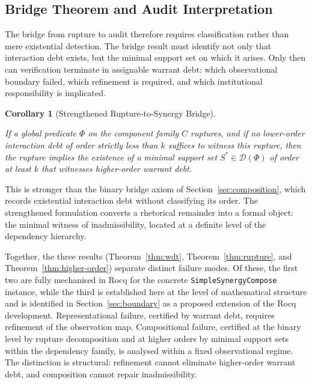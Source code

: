 \documentclass[12pt]{article}
\theoremstyle{plain}
\newtheorem{corollary}[theorem]{Corollary}
\theoremstyle{definition}
\theoremstyle{remark}
\begin{document}
\subsection{Bridge Theorem and Audit Interpretation}
\label{subsec:bridge}

The bridge from rupture to audit therefore requires classification
rather than mere existential detection.
The bridge result must identify not only that interaction debt exists,
but the minimal support set on which it arises.
Only then can verification terminate in assignable warrant debt:
which observational boundary failed, which refinement is required,
and which institutional responsibility is implicated.

\begin{corollary}[Strengthened Rupture-to-Synergy Bridge]
\label{cor:bridge}

If a global predicate $\Phi$ on the component family $C$ ruptures, and
if no lower-order interaction debt of order strictly less than $k$
suffices to witness this rupture, then the rupture implies the
existence of a minimal support set $S^* \in \mathcal{D}(\Phi)$ of
order at least $k$ that witnesses higher-order warrant debt.

\end{corollary}

This is stronger than the binary bridge axiom of
Section~\ref{sec:composition}, which records existential interaction
debt without classifying its order.
The strengthened formulation converts a rhetorical remainder into a
formal object: the minimal witness of inadmissibility, located at a
definite level of the dependency hierarchy.

Together, the three results (Theorem~\ref{thm:wdt},
Theorem~\ref{thm:rupture}, and Theorem~\ref{thm:higher-order}) separate
distinct failure modes.
Of these, the first two are fully mechanised in Rocq for the concrete
\texttt{SimpleSynergyCompose} instance, while the third is established
here at the level of mathematical structure and is identified in
Section~\ref{sec:boundary} as a proposed extension of the Rocq
development.
Representational failure, certified by warrant debt, requires
refinement of the observation map.
Compositional failure, certified at the binary level by rupture
decomposition and at higher orders by minimal support sets within the
dependency family, is analysed within a fixed observational regime.
The distinction is structural: refinement cannot eliminate higher-order
warrant debt, and composition cannot repair inadmissibility.
\end{document}
